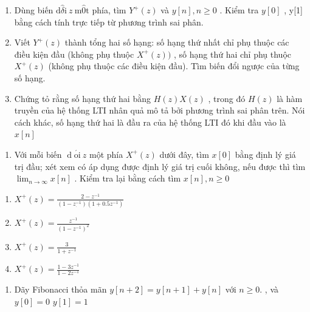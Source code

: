 \documentclass[
  10
]{article}
\providecommand{\tightlist}{%
  \setlength{\itemsep}{0pt}\setlength{\parskip}{0pt}}
\begin{document}
\begin{enumerate}
\def\labelenumi{(\alph{enumi})}
\item
  Dùng biến
  \(\mathrm { d } \hat { \delta } \mathrm { i } ~ z \ \mathrm { m } \hat { \mathrm { 0 } } \mathrm { t }\)
  phía, tìm \(Y ^ { + } ( z )\) và \(y [ n ] , n \geq 0\) . Kiểm tra
  \(y [ 0 ]\) , y{[}1{]} bằng cách tính trực tiếp từ phương trình sai
  phân.
\item
  Viết \(Y ^ { + } ( z )\) thành tổng hai số hạng: số hạng thứ nhất chỉ
  phụ thuộc các điều kiện đầu (không phụ thuộc \(X ^ { + } ( z ) )\) ,
  số hạng thứ hai chỉ phụ thuộc \(X ^ { + } ( z )\) (không phụ thuộc các
  điều kiện đầu). Tìm biến đổi ngược của từng số hạng.
\item
  Chứng tỏ rằng số hạng thứ hai bằng \(H ( z ) X ( z )\) , trong đó
  \(H ( z )\) là hàm truyền của hệ thống LTI nhân quả mô tả bởi phương
  trình sai phân trên. Nói cách khác, số hạng thứ hai là đầu ra của hệ
  thống LTI đó khi đầu vào là \(x [ n ]\)
\end{enumerate}

\begin{enumerate}
\def\labelenumi{\arabic{enumi}.}
\setcounter{enumi}{22}
\tightlist
\item
  Với mỗi biến \(\operatorname { d } \acute { \mathrm { o i } } \ z\)
  một phía \(X ^ { + } ( z )\) dưới đây, tìm \(x [ 0 ]\) bằng định lý
  giá trị đầu; xét xem có áp dụng được định lý giá trị cuối không, nếu
  được thì tìm
  \(\scriptstyle \operatorname* { l i m } _ { n \to \infty } x [ n ]\) .
  Kiểm tra lại bằng cách tìm \(x [ n ] , n \geq 0\)
\end{enumerate}

\begin{enumerate}
\def\labelenumi{(\alph{enumi})}
\item
  \(X ^ { + } ( z ) = \frac { 2 - z ^ { - 1 } } { ( 1 - z _ { . } ^ { - 1 } ) ( 1 + 0 . 5 z ^ { - 1 } ) }\)
\item
  \(X ^ { + } ( z ) = { \frac { z ^ { - 1 } } { ( 1 - z ^ { - 1 } ) ^ { 2 } } }\)
\item
  \(X ^ { + } ( z ) = \frac { 3 } { 1 + z ^ { - 1 } }\)
\item
  \(X ^ { + } ( z ) = { \frac { 1 - 3 z ^ { - 1 } } { 1 - 2 z ^ { - 1 } } }\)
\end{enumerate}

\begin{enumerate}
\def\labelenumi{\arabic{enumi}.}
\setcounter{enumi}{23}
\tightlist
\item
  Dãy Fibonacci thỏa mãn \(y [ n + 2 ] = y [ n + 1 ] + y [ n ]\) với
  \(n \geq 0 .\) , và \(y [ 0 ] = 0\) \(y [ 1 ] = 1\)
\end{enumerate}
\end{document}
